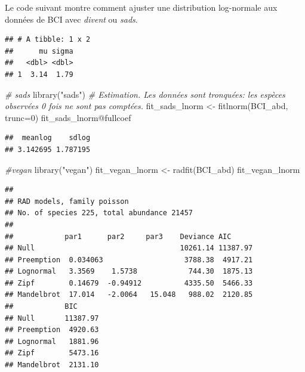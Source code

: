 \documentclass[
  11pt,
  american,
  a4paper,
  extrafontsizes,onecolumn,openright
  ]{memoir}
\newenvironment{Shaded}{\begin{snugshade}}{\end{snugshade}}
\newcommand{\AttributeTok}[1]{\textcolor[rgb]{0.77,0.63,0.00}{#1}}
\newcommand{\CommentTok}[1]{\textcolor[rgb]{0.56,0.35,0.01}{\textit{#1}}}
\newcommand{\DecValTok}[1]{\textcolor[rgb]{0.00,0.00,0.81}{#1}}
\newcommand{\FunctionTok}[1]{\textcolor[rgb]{0.00,0.00,0.00}{#1}}
\newcommand{\NormalTok}[1]{#1}
\newcommand{\OtherTok}[1]{\textcolor[rgb]{0.56,0.35,0.01}{#1}}
\newcommand{\SpecialCharTok}[1]{\textcolor[rgb]{0.00,0.00,0.00}{#1}}
\newcommand{\StringTok}[1]{\textcolor[rgb]{0.31,0.60,0.02}{#1}}
\begin{document}
Le code suivant montre comment ajuster une distribution log-normale aux données de BCI avec \emph{divent} ou \emph{sads}.

\scriptsize

\begin{Shaded}
\end{Shaded}

\begin{verbatim}
## # A tibble: 1 x 2
##      mu sigma
##   <dbl> <dbl>
## 1  3.14  1.79
\end{verbatim}

\begin{Shaded}
\begin{Highlighting}[]
\CommentTok{\# sads}
\FunctionTok{library}\NormalTok{(}\StringTok{"sads"}\NormalTok{)}
\CommentTok{\# Estimation. Les données sont tronquées: les espèces observées 0 fois ne sont pas comptées.}
\NormalTok{fit\_sads\_lnorm }\OtherTok{\textless{}{-}} \FunctionTok{fitlnorm}\NormalTok{(BCI\_abd, }\AttributeTok{trunc=}\DecValTok{0}\NormalTok{)}
\NormalTok{fit\_sads\_lnorm}\SpecialCharTok{@}\NormalTok{fullcoef}
\end{Highlighting}
\end{Shaded}

\begin{verbatim}
##  meanlog    sdlog 
## 3.142695 1.787195
\end{verbatim}

\begin{Shaded}
\begin{Highlighting}[]
\CommentTok{\#vegan}
\FunctionTok{library}\NormalTok{(}\StringTok{"vegan"}\NormalTok{)}
\NormalTok{fit\_vegan\_lnorm }\OtherTok{\textless{}{-}} \FunctionTok{radfit}\NormalTok{(BCI\_abd)}
\NormalTok{fit\_vegan\_lnorm}
\end{Highlighting}
\end{Shaded}

\begin{verbatim}
## 
## RAD models, family poisson 
## No. of species 225, total abundance 21457
## 
##            par1      par2     par3    Deviance AIC     
## Null                                  10261.14 11387.97
## Preemption  0.034063                   3788.38  4917.21
## Lognormal   3.3569    1.5738            744.30  1875.13
## Zipf        0.14679  -0.94912          4335.50  5466.33
## Mandelbrot  17.014   -2.0064   15.048   988.02  2120.85
##            BIC     
## Null       11387.97
## Preemption  4920.63
## Lognormal   1881.96
## Zipf        5473.16
## Mandelbrot  2131.10
\end{verbatim}
\end{document}
